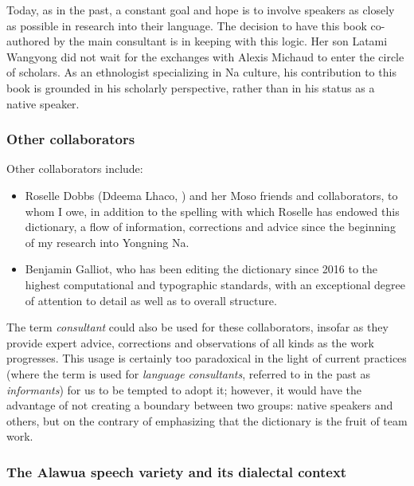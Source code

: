 Today, as in the past, a constant goal and hope is to involve speakers as closely as possible in research into their language. The decision to have this book co-authored by the main consultant is in keeping with this logic. Her son Latami Wangyong did not wait for the exchanges with Alexis Michaud to enter the circle of scholars. As an ethnologist specializing in Na culture, his contribution to this book is grounded in his scholarly perspective, rather than in his status as a native speaker.

\subsubsection{Other collaborators}

Other collaborators include:

\begin{itemize}
    \item Roselle Dobbs (Ddeema Lhaco, ) and her Moso friends and collaborators, to whom I owe, in addition to the spelling with which Roselle has endowed this dictionary, a flow of information, corrections and advice since the beginning of my research into Yongning Na.
    \item Benjamin Galliot, who has been editing the dictionary since 2016 to the highest computational and typographic standards, with an exceptional degree of attention to detail as well as to overall structure.
\end{itemize}

The term \emph{consultant} could also be used for these collaborators, insofar as they provide expert advice, corrections and observations of all kinds as the work progresses. This usage is certainly too paradoxical in the light of current practices (where the term is used for \emph{language consultants}, referred to in the past as \emph{informants}) for us to be tempted to adopt it; however, it would have the advantage of not creating a boundary between two groups: native speakers and others, but on the contrary of emphasizing that the dictionary is the fruit of team work.

\subsubsection{The Alawua speech variety and its dialectal context}

